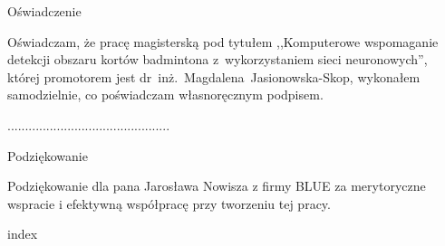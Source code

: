 \documentclass[a4paper,11pt,twoside,openright]{report}
\theoremstyle{definition}
\newcommand{\tytul}{Komputerowe wspomaganie detekcji obszaru kortów badmintona z~wykorzystaniem sieci neuronowych}
\newcommand{\type}{magisters} %
\newcommand{\supervisor}{\mbox{dr inż. Magdalena Jasionowska-Skop}}
\newcommand{\blue}{BLUE}
\begin{document}
\begin{center}
Oświadczenie
\end{center}

\indent Oświadczam, że pracę \type ką pod
tytułem ,,\tytul '', której promotorem jest \supervisor , wykonałem
samodzielnie, co poświadczam własnoręcznym podpisem.
\vspace{2cm}


\begin{flushright}
  \begin{minipage}{50mm}
    \begin{center}
      ..............................................

    \end{center}
  \end{minipage}
\end{flushright}

\thispagestyle{empty}
\newpage

\null\thispagestyle{empty}\newpage



\null \hfill
\par\vspace{6cm}

\begin{center}
Podziękowanie
\end{center}

\indent Podziękowanie dla pana Jarosława Nowisza z firmy \blue{} za merytoryczne wspracie i efektywną współpracę przy tworzeniu tej pracy.
\vspace{2cm}

\thispagestyle{empty}
\newpage

\null\thispagestyle{empty}\newpage


\tableofcontents
\thispagestyle{empty}


\null\thispagestyle{empty}\newpage
\pagestyle{fancy}
\setcounter{page}{11} %

{index}

\end{document}
